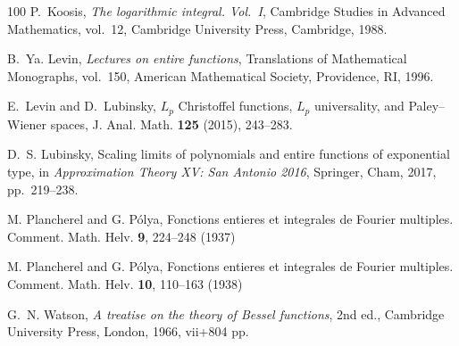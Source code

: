 \documentclass[a4paper,reqno,12pt]{amsart}
\begin{document}
\begin{thebibliography}{100}
P.~Koosis,
\emph{The logarithmic integral. Vol.~I},
Cambridge Studies in Advanced Mathematics, vol.~12,
Cambridge University Press, Cambridge, 1988.



B.~Ya. Levin,
\emph{Lectures on entire functions},
Translations of Mathematical Monographs, vol.~150,
American Mathematical Society, Providence, RI, 1996.

E.~Levin and D.~Lubinsky,
{$L_p$ Christoffel functions, $L_p$ universality, and Paley--Wiener spaces},
J. Anal. Math. \textbf{125} (2015), 243--283.

D.~S. Lubinsky,
\newblock Scaling limits of polynomials and entire functions of exponential type,
\newblock in \emph{Approximation Theory XV: San Antonio 2016},
\newblock Springer, Cham, 2017, pp.~219--238.

M. Plancherel and G. Pólya, Fonctions entieres et integrales de Fourier multiples. Comment. Math. Helv.
\textbf{9}, 224–248 (1937)

M. Plancherel and G. Pólya, Fonctions entieres et integrales de Fourier multiples. Comment. Math. Helv.
\textbf{10}, 110–163 (1938)

G.~N. Watson,
\emph{A treatise on the theory of Bessel functions},
2nd ed.,
Cambridge University Press, London, 1966, vii+804 pp.

\end{thebibliography}
\end{document}

